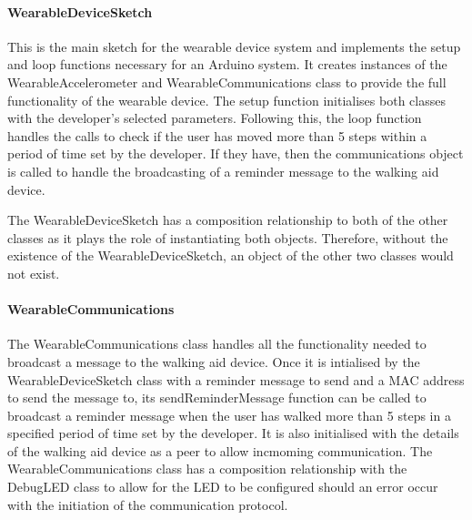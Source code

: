                 \clearpage
                \thispagestyle{empty}
                \begin{landscape}
                    
                \end{landscape}

                \paragraph{WearableDeviceSketch}\mbox{}

                    This is the main sketch for the wearable device system and implements the setup and loop functions necessary for an Arduino system. It creates instances of the WearableAccelerometer and WearableCommunications class to provide the full functionality of the wearable device. The setup function initialises both classes with the developer's selected parameters. Following this, the loop function handles the calls to check if the user has moved more than 5 steps within a period of time set by the developer. If they have, then the communications object is called to handle the broadcasting of a reminder message to the walking aid device.

                    The WearableDeviceSketch has a composition relationship to both of the other classes as it plays the role of instantiating both objects. Therefore, without the existence of the WearableDeviceSketch, an object of the other two classes would not exist.

                \paragraph{WearableCommunications}\mbox{}

                    The WearableCommunications class handles all the functionality needed to broadcast a message to the walking aid device. Once it is intialised by the WearableDeviceSketch class with a reminder message to send and a MAC address to send the message to, its sendReminderMessage function can be called to broadcast a reminder message when the user has walked more than 5 steps in a specified period of time set by the developer. It is also initialised with the details of the walking aid device as a peer to allow incmoming communication. The WearableCommunications class has a composition relationship with the DebugLED class to allow for the LED to be configured should an error occur with the initiation of the communication protocol.

